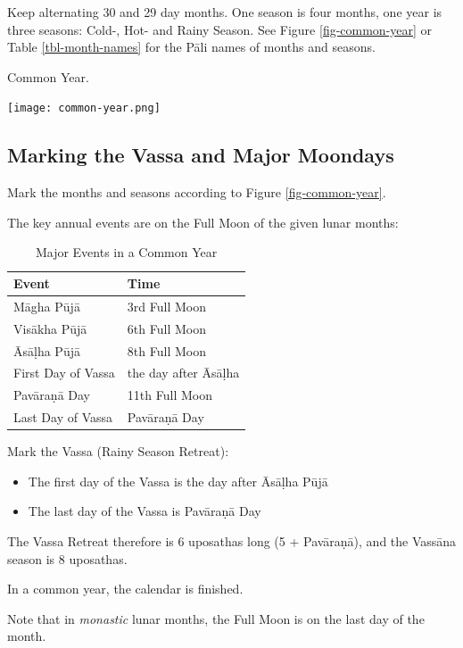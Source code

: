 \documentclass[11pt,oneside]{memoir-article}
\begin{document}
Keep alternating 30 and 29 day months. One season is four months, one year is
three seasons: Cold-, Hot- and Rainy Season. See Figure \ref{fig-common-year} or
Table \ref{tbl-month-names} for the Pāli names of months and seasons.

\begin{marginfigure}[-5mm]
\caption{\label{fig-common-year} Common Year.}
\texttt{[image: common-year.png]}
\end{marginfigure}

\subsection{Marking the Vassa and Major Moondays}
\label{sec-1-2-2}
\label{marking-the-moondays-common-year}

Mark the months and seasons according to Figure \ref{fig-common-year}.

The key annual events are on the Full Moon of the given lunar months:

\begin{table}[h]
\caption{\label{tbl-major-events} Major Events in a Common Year}
\centering
\begin{tabular}{ll}
Event & Time\\
\hline
Māgha Pūjā & 3rd Full Moon\\
Visākha Pūjā & 6th Full Moon\\
Āsāḷha Pūjā & 8th Full Moon\\
First Day of Vassa & the day after Āsāḷha\\
Pavāraṇā Day & 11th Full Moon\\
Last Day of Vassa & Pavāraṇā Day\\
\end{tabular}
\end{table}

Mark the Vassa (Rainy Season Retreat):

\begin{itemize}
\item The first day of the Vassa is the day after Āsāḷha Pūjā
\item The last day of the Vassa is Pavāraṇā Day
\end{itemize}

The Vassa Retreat therefore is 6 uposathas long (5 + Pavāraṇā), and the Vassāna
season is 8 uposathas.

In a common year, the calendar is finished. 

Note that in \emph{monastic} lunar months, the Full Moon is on the last day of the month.
\end{document}
